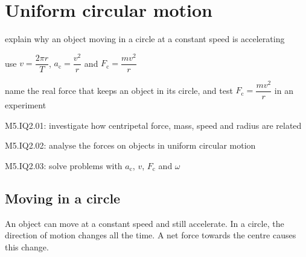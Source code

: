 \chapter{Uniform circular motion}\label{ch2:chap}


\begin{goals}
  \item explain why an object moving in a circle at a constant speed is accelerating
  \item use $v = \dfrac{2\pi r}{T}$, $a_\mathrm{c} = \dfrac{v^2}{r}$ and $F_\mathrm{c} = \dfrac{mv^2}{r}$
  \item name the real force that keeps an object in its circle, and test
        $F_\mathrm{c} = \dfrac{mv^2}{r}$ in an experiment
\end{goals}

\begin{syllabus}
  \item M5.IQ2.01: investigate how centripetal force, mass, speed and radius are related
  \item M5.IQ2.02: analyse the forces on objects in uniform circular motion
  \item M5.IQ2.03: solve problems with $a_\mathrm{c}$, $v$, $F_\mathrm{c}$ and $\omega$
\end{syllabus}

\section{Moving in a circle}\label{ch2:sec:circle}

\begin{bigidea}
An object can move at a constant speed and still accelerate. In a circle, the
direction of motion changes all the time. A net force towards the centre causes
this change.
\end{bigidea}

\begin{keywords}
\end{keywords}

